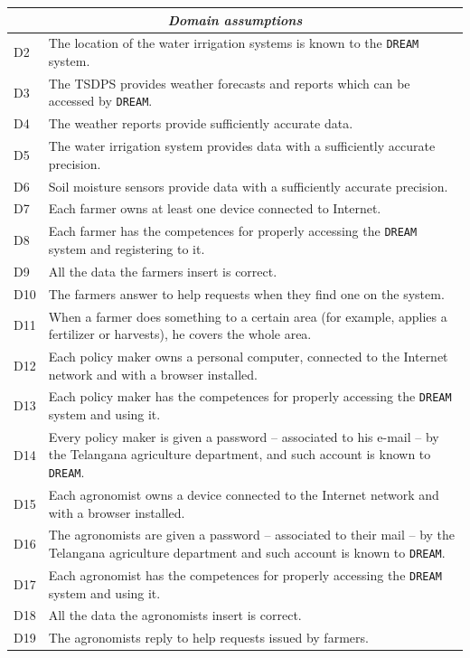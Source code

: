 \documentclass{article}
\begin{document}
\begin{longtable}[c]{|m{0.75cm}|m{11cm}|}
 \hline
 \multicolumn{2}{|c|}{\cellcolor{white}\textbf{\emph{Domain assumptions}}}
 \endfirsthead
 \endhead
 \endfoot
 \endlastfoot
  \hline
  D1 & The location of the sensors is known to the \verb|DREAM| system.\\
  \hline
   D2 & The location of the water irrigation systems is known to the \verb|DREAM| system.\\
  \hline
  D3 & The TSDPS provides weather forecasts and reports which can be accessed by \verb|DREAM|.\\
  \hline
  D4 & The weather reports provide sufficiently accurate data.\\
  \hline
  D5 & The water irrigation system provides data with a sufficiently accurate precision.\\
  \hline
  D6 & Soil moisture sensors provide data with a sufficiently accurate precision.\\
  \hline
  D7 & Each farmer owns at least one device connected to Internet.\\
  \hline
  D8 & Each farmer has the competences for properly accessing the \verb|DREAM| system and registering to it.\\
  \hline
  D9 & All the data the farmers insert is correct.\\
  \hline
  D10 & The farmers answer to help requests when they find one on the system.\\
  \hline
  D11 & When a farmer does something to a certain area (for example, applies a fertilizer or harvests), he covers the whole area.\\
  \hline
  D12 & Each policy maker owns a personal computer, connected to the Internet network and with a browser installed.\\
 \hline
  D13 & Each policy maker has the competences for properly accessing the \verb|DREAM| system and using it.\\
  \hline
  D14 & Every policy maker is given a password – associated to his e-mail – by the Telangana agriculture department, and such account is known to \verb|DREAM|.\\
  \hline
  D15 & Each agronomist owns a device connected to the Internet network and with a browser installed.\\
  \hline
  D16 & The agronomists are given a password – associated to their mail – by the Telangana agriculture department and such account is known to \verb|DREAM|.\\
  \hline
  D17 & Each agronomist has the competences for properly accessing the \verb|DREAM| system and using it.\\
   \hline
  D18 & All the data the agronomists insert is correct.\\
  \hline
  D19 & The agronomists reply to help requests issued by farmers.\\
  \hline
  \end{longtable}
\end{document}
